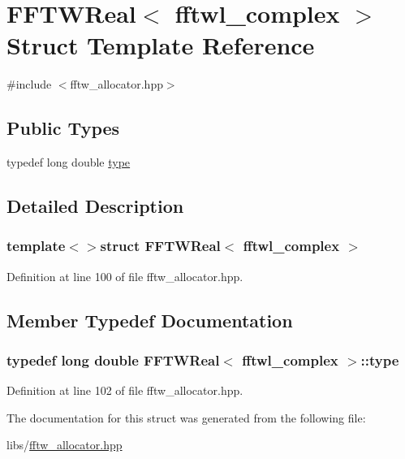 \hypertarget{struct_f_f_t_w_real_3_01fftwl__complex_01_4}{\section{F\-F\-T\-W\-Real$<$ fftwl\-\_\-complex $>$ Struct Template Reference}
\label{struct_f_f_t_w_real_3_01fftwl__complex_01_4}
}


{\ttfamily \#include $<$fftw\-\_\-allocator.\-hpp$>$}

\subsection*{Public Types}
\begin{DoxyCompactItemize}
\item 
typedef long double \hyperlink{struct_f_f_t_w_real_3_01fftwl__complex_01_4_a8932e4c5bac237ced223fdf7d9fd9c1d}{type}
\end{DoxyCompactItemize}


\subsection{Detailed Description}
\subsubsection*{template$<$$>$struct F\-F\-T\-W\-Real$<$ fftwl\-\_\-complex $>$}



Definition at line 100 of file fftw\-\_\-allocator.\-hpp.



\subsection{Member Typedef Documentation}
\hypertarget{struct_f_f_t_w_real_3_01fftwl__complex_01_4_a8932e4c5bac237ced223fdf7d9fd9c1d}{
\subsubsection[{type}]{\setlength{\rightskip}{0pt plus 5cm}typedef long double {\bf F\-F\-T\-W\-Real}$<$ fftwl\-\_\-complex $>$\-::{\bf type}}}\label{struct_f_f_t_w_real_3_01fftwl__complex_01_4_a8932e4c5bac237ced223fdf7d9fd9c1d}


Definition at line 102 of file fftw\-\_\-allocator.\-hpp.



The documentation for this struct was generated from the following file\-:\begin{DoxyCompactItemize}
\item 
libs/\hyperlink{fftw__allocator_8hpp}{fftw\-\_\-allocator.\-hpp}\end{DoxyCompactItemize}
